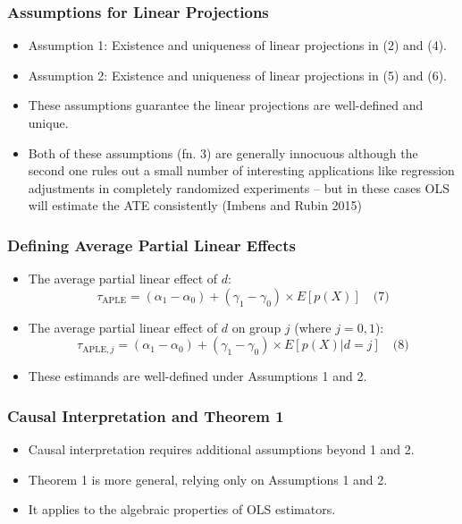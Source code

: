 \documentclass{beamer}
\begin{document}
\begin{frame}
\frametitle{Assumptions for Linear Projections}
\begin{itemize}
    \item Assumption 1: Existence and uniqueness of linear projections in (2) and (4).
    \item Assumption 2: Existence and uniqueness of linear projections in (5) and (6).
    \item These assumptions guarantee the linear projections are well-defined and unique.
    \item Both of these assumptions (fn. 3) are generally innocuous although the second one rules out a small number of interesting applications like regression adjustments in completely randomized experiments -- but in these cases OLS will estimate the ATE consistently (Imbens and Rubin 2015)
\end{itemize}
\end{frame}

\begin{frame}
\frametitle{Defining Average Partial Linear Effects}
\begin{itemize}
    \item The average partial linear effect of \( d \):
    \[ \tau_{\text{APLE}} = (\alpha_1 - \alpha_0) + (\gamma_1 - \gamma_0) \times E[p(X)] \quad \text{(7)} \]
    \item The average partial linear effect of \( d \) on group \( j \) (where \( j = 0, 1 \)):
    \[ \tau_{\text{APLE}, j} = (\alpha_1 - \alpha_0) + (\gamma_1 - \gamma_0) \times E[p(X) | d = j] \quad \text{(8)} \]
    \item These estimands are well-defined under Assumptions 1 and 2.
\end{itemize}
\end{frame}

\begin{frame}
\frametitle{Causal Interpretation and Theorem 1}
\begin{itemize}
    \item Causal interpretation requires additional assumptions beyond 1 and 2.
    \item Theorem 1 is more general, relying only on Assumptions 1 and 2.
    \item It applies to the algebraic properties of OLS estimators.
\end{itemize}
\end{frame}
\end{document}
